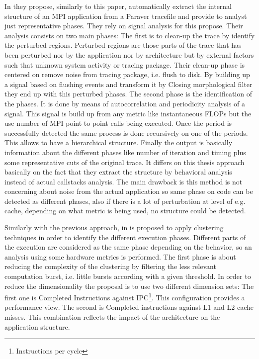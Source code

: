 \documentclass[12pt]{report}
\begin{document}
In \cite{casas2007automatic} they propose, similarly to this paper, 
automatically extract the internal structure of an MPI application from a
Paraver tracefile and provide to analyst just representative phases. 
They rely on signal analysis for this propose. 
Their analysis consists on two main phases:
The first is to clean-up the trace by identify the perturbed regions.
Perturbed regions are those parts of the trace that has been perturbed nor by
the application nor by architecture but by external factors such that unknown
system activity or tracing package. Their clean-up phase is centered on remove
noise from tracing package, i.e. flush to disk. By building up a signal based
on flushing events and transform it by Closing morphological filter they end up
with this perturbed phases. The second phase is the identification of the
phases. It is done by means of autocorrelation and periodicity analysis of a
signal. This signal is build up from any metric like instantaneous FLOPs but the
use number of MPI point to point calls being executed. Once the period is
successfully detected the same process is done recursively on one of the
periods. This allows to have a hierarchical structure. Finally the output is
basically information about the different phases like number of iteration and
timing plus some representative cuts of the original trace. It differs on this
thesis approach basically on the fact that they extract the structure by
behavioral analysis instead of actual callstacks analysis. The main drawback is
this method is not concerning about noise from the actual application so same
phase on code can be detected as different phases, also if there is a lot of
perturbation at level of e.g. cache, depending on what metric is being used, no
structure could be detected. 

Similarly with the previous approach, in 
\cite{gonzalez2013application} is proposed to apply clustering techniques in
order to identify the different execution phases. Different parts of the
execution are considered as the same phase depending on the behavior,
so an analysis using some hardware metrics is
performed. The first phase is about reducing the complexity of the clustering by
filtering the less relevant computation burst, i.e. little bursts according
with a given threshold. In order to reduce the dimensionality the proposal is to
use two different dimension sets: The first one is Completed Instructions
against IPC\footnote{Instructions per cycle}. This configuration provides a
performance view. The second is Completed instructions against L1 and L2 cache
misses. This combination reflects the impact of the architecture on the
application structure. 
\end{document}
